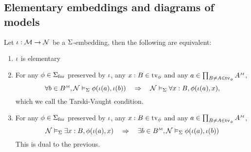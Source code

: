 \subsection{Elementary embeddings and diagrams of models}
\begin{prop}
    Let $\iota : \mathcal{M} \to \mathcal{N}$ be a $\Sigma$-embedding, 
    then the following are equivalent:
    \begin{enumerate}
        \item $\iota$ is elementary 
        \item For any 
            $\phi \in {\Sigma}_\mathrm{for}$ preserved by $\iota$,
            any $x : B \in \textrm{tv}_{\phi}$ 
            and any $a \in \prod_{B \ne A \in \tv{\phi}} \mmintp{A}$,
            \[\forall b \in \mmintp{B}, \NN \model{\Si} \phi(\io(a),\io(b)) 
            \quad \implies \quad 
            \NN \model{\Si} \forall x : B, \phi(\io(a),x),\]
            which we call the Tarski-Vaught condition.
        \item For any 
            $\phi \in {\Sigma}_\mathrm{for}$ preserved by $\iota$,
            any $x : B \in \textrm{tv}_{\phi}$ 
            and any $a \in \prod_{B \ne A \in \tv{\phi}} \mmintp{A}$,
            \[\NN \model{\Si} \exists x : B, \phi(\io(a),x)
            \quad \implies \quad
            \exists b \in \mmintp{B}, \NN \model{\Si} \phi(\io(a),\io(b))\]
            This is dual to the previous.
    \end{enumerate}
\end{prop}
